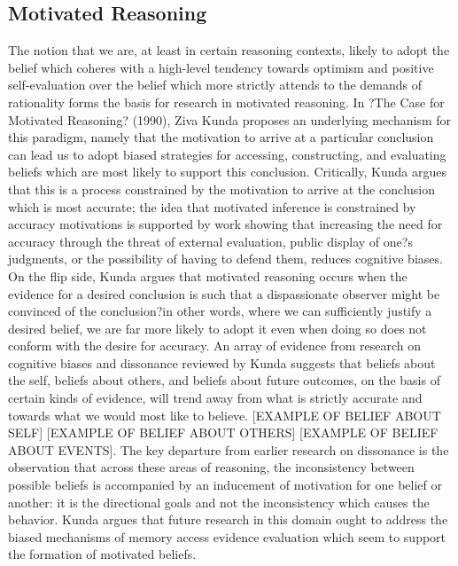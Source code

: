 \documentclass{article}
\begin{document}
\subsection{Motivated Reasoning}
The notion that we are, at least in certain reasoning contexts, likely to adopt the belief which coheres with a high-level tendency towards optimism and positive self-evaluation over the belief which more strictly attends to the demands of rationality forms the basis for research in motivated reasoning. In ?The Case for Motivated Reasoning? (1990), Ziva Kunda proposes an underlying mechanism for this paradigm, namely that the motivation to arrive at a particular conclusion can lead us to adopt biased strategies for accessing, constructing, and evaluating beliefs which are most likely to support this conclusion. Critically, Kunda argues that this is a process constrained by the motivation to arrive at the conclusion which is most accurate; the idea that motivated inference is constrained by accuracy motivations is supported by work showing that increasing the need for accuracy through the threat of external evaluation, public display of one?s judgments, or the possibility of having to defend them, reduces cognitive biases. On the flip side, Kunda argues that motivated reasoning occurs when the evidence for a desired conclusion is such that a dispassionate observer might be convinced of the conclusion?in other words, where we can sufficiently justify a desired belief, we are far more likely to adopt it even when doing so does not conform with the desire for accuracy. An array of evidence from research on cognitive biases and dissonance reviewed by Kunda suggests that beliefs about the self, beliefs about others, and beliefs about future outcomes, on the basis of certain kinds of evidence, will trend away from what is strictly accurate and towards what we would most like to believe. [EXAMPLE OF BELIEF ABOUT SELF] [EXAMPLE OF BELIEF ABOUT OTHERS] [EXAMPLE OF BELIEF ABOUT EVENTS]. The key departure from earlier research on dissonance is the observation that across these areas of reasoning, the inconsistency between possible beliefs is accompanied by an inducement of motivation for one belief or another: it is the directional goals and not the inconsistency which causes the behavior. Kunda argues that future research in this domain ought to address the biased mechanisms of memory access evidence evaluation which seem to support the formation of motivated beliefs. 
\end{document}

